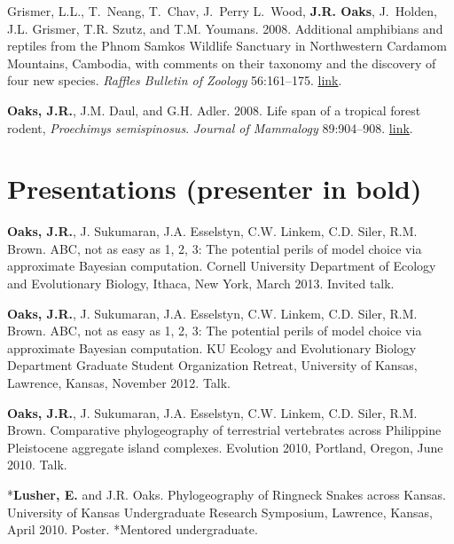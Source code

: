 \documentclass[10pt]{article}
\newcommand{\myHangIndent}{\hangindent=5mm}
\begin{document}
\begin{thebibliography}{8}
Grismer, L.L., T.~Neang, T.~Chav, J.~Perry L.~Wood, {\bf J.R. Oaks}, J.~Holden,
  J.L. Grismer, T.R. Szutz, and T.M. Youmans. 2008.
\newblock Additional amphibians and reptiles from the {P}hnom {S}amkos
  {W}ildlife {S}anctuary in {N}orthwestern {C}ardamom {M}ountains, {C}ambodia,
  with comments on their taxonomy and the discovery of four new species.
\newblock \emph{Raffles Bulletin of Zoology} 56:161--175.
\newblock
  \href{http://rmbr.nus.edu.sg/rbz/biblio/56/56rbz161-175.pdf}{link}.

{\bf Oaks, J.R.}, J.M. Daul, and G.H. Adler. 2008.
\newblock Life span of a tropical forest rodent, \emph{{P}roechimys
  semispinosus}.
\newblock \emph{Journal of Mammalogy} 89:904--908.
\newblock \href{http://dx.doi.org/10.1644/07-MAMM-A-045.1}{link}.

\end{thebibliography}

\section*{Presentations (presenter in bold)}
\myHangIndent
{\bf Oaks, J.R.}, J. Sukumaran, J.A. Esselstyn, C.W. Linkem, C.D. Siler, R.M.
Brown.
ABC, not as easy as 1, 2, 3: The potential perils of model choice via
approximate Bayesian computation.
Cornell University Department of Ecology and Evolutionary Biology, Ithaca,
New York, March 2013.
Invited talk.

\myHangIndent
{\bf Oaks, J.R.}, J. Sukumaran, J.A. Esselstyn, C.W. Linkem, C.D. Siler, R.M.
Brown.
ABC, not as easy as 1, 2, 3: The potential perils of model choice via
approximate Bayesian computation.
KU Ecology and Evolutionary Biology Department Graduate Student Organization
Retreat, University of Kansas, Lawrence, Kansas, November 2012.
Talk.

\myHangIndent
{\bf Oaks, J.R.}, J. Sukumaran, J.A. Esselstyn, C.W. Linkem, C.D. Siler, R.M.
Brown.
Comparative phylogeography of terrestrial vertebrates across Philippine
Pleistocene aggregate island complexes.
Evolution 2010, Portland, Oregon, June 2010.
Talk.

\myHangIndent
*{\bf Lusher, E.} and J.R. Oaks.
Phylogeography of Ringneck Snakes across Kansas.
University of Kansas Undergraduate Research Symposium, Lawrence, Kansas, April
2010.
Poster.
*Mentored undergraduate.
\end{document}
